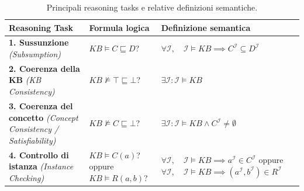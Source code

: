 \begin{table}[htbp]
    \centering
    \renewcommand{\arraystretch}{1.8}
    \begin{tabular}{|p{}|p{}|p{}|}
        \hline
        \textbf{Reasoning Task} &
        \textbf{Formula logica} &
        \textbf{Definizione semantica} \\
        \hline

        \textbf{1. Sussunzione}
        \newline
        \textit{(Subsumption)}
        &
        $KB \models C \sqsubseteq D$?
        &
        $\displaystyle
        \forall \mathcal{I}, \quad
        \mathcal{I} \models KB
        \implies
        C^{\mathcal{I}} \subseteq D^{\mathcal{I}}$
        \\
        \hline

        \textbf{2. Coerenza della KB}
        \newline
        \textit{(KB Consistency)}
        &
        $KB \not\models \top \sqsubseteq \bot$?
        &
        $\displaystyle
        \exists \mathcal{I} :
        \mathcal{I} \models KB$
        \\
        \hline

        \textbf{3. Coerenza del concetto}
        \newline
        \textit{(Concept Consistency / Satisfiability)}
        &
        $KB \not\models C \sqsubseteq \bot$?
        &
        $\displaystyle
        \exists \mathcal{I} :
        \mathcal{I} \models KB
        \land
        C^{\mathcal{I}} \neq \emptyset$
        \\
        \hline

        \textbf{4. Controllo di istanza}
        \newline
        \textit{(Instance Checking)}
        &
        $KB \models C(a)$?
        \newline
        oppure
        \newline
        $KB \models R(a,b)$?
        &
        $\displaystyle
        \forall \mathcal{I}, \quad
        \mathcal{I} \models KB
        \implies
        a^{\mathcal{I}} \in C^{\mathcal{I}}$
        \newline
        oppure
        \newline
        $\displaystyle
        \forall \mathcal{I}, \quad
        \mathcal{I} \models KB
        \implies
        (a^{\mathcal{I}},b^{\mathcal{I}})
        \in R^{\mathcal{I}}$
        \\
        \hline
    \end{tabular}
    \caption{Principali reasoning tasks e relative definizioni semantiche.}
    \label{tab:reasoning_tasks}
\end{table}

